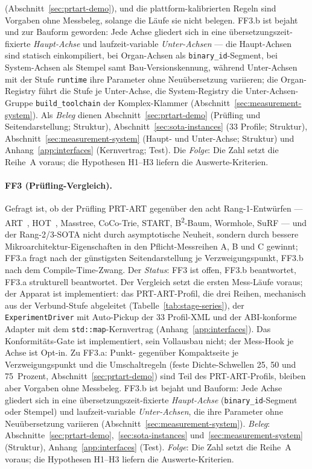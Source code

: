 \begin{nurlang}
(Abschnitt~\ref{sec:prtart-demo}), und die plattform-kalibrierten Regeln sind Vorgaben ohne Messbeleg, solange die
Läufe sie nicht belegen. FF3.b ist bejaht und zur Bauform geworden: Jede Achse gliedert sich in eine
übersetzungszeit-fixierte \emph{Haupt-Achse} und laufzeit-variable \emph{Unter-Achsen}
--- die Haupt-Achsen sind statisch einkompiliert, bei Organ-Achsen als \texttt{binary\_id}-Segment, bei
System-Achsen als Stempel samt Bau-Versionskennung, während Unter-Achsen mit der Stufe
\texttt{runtime} ihre Parameter ohne Neuübersetzung variieren; die Organ-Registry führt die Stufe je
Unter-Achse, die System-Registry die Unter-Achsen-Gruppe \texttt{build\_toolchain} der Komplex-Klammer
(Abschnitt~\ref{sec:measurement-system}). Als \emph{Beleg} dienen Abschnitt~\ref{sec:prtart-demo} (Prüfling
und Seitendarstellung; Struktur), Abschnitt~\ref{sec:sota-instances} (33 Profile; Struktur),
Abschnitt~\ref{sec:measurement-system} (Haupt- und Unter-Achse; Struktur) und
Anhang~\ref{app:interfaces} (Kernvertrag; Test). Die \emph{Folge}: Die Zahl setzt die Reihe~A voraus; die
Hypothesen H1--H3 liefern die Auswerte-Kriterien.
\end{nurlang}
\begin{nurkurz}
\paragraph{FF3 (Prüfling-Vergleich).} Gefragt ist, ob der Prüfling PRT-ART gegenüber den acht
Rang-1-Entwürfen --- ART~\cite{leis2013art}, HOT~\cite{binna2018hot}, Masstree, CoCo-Trie, START,
B\textsuperscript{2}-Baum, Wormhole, SuRF --- und der Rang-2/3-SOTA nicht durch asymptotische Neuheit,
sondern
durch bessere Mikroarchitektur-Eigenschaften in den Pflicht-Messreihen A, B und C gewinnt; FF3.a fragt nach
der günstigsten Seitendarstellung je Verzweigungspunkt, FF3.b nach dem Compile-Time-Zwang. Der
\emph{Status}:
FF3 ist offen, FF3.b beantwortet, FF3.a strukturell beantwortet. Der Vergleich setzt die ersten Mess-Läufe
voraus; der Apparat ist implementiert: das PRT-ART-Profil, die drei Reihen, mechanisch aus der Verbund-Stufe
abgeleitet (Tabelle~\ref{tab:stage-series}), der \texttt{ExperimentDriver} mit Auto-Pickup der 33 Profil-XML
und der ABI-konforme Adapter mit dem \texttt{std::map}-Kernvertrag (Anhang~\ref{app:interfaces}). Das
Konformitäts-Gate ist
implementiert, sein Vollausbau nicht; der Mess-Hook je Achse ist Opt-in. Zu FF3.a: Punkt- gegenüber
Kompaktseite je Verzweigungspunkt und die Umschaltregeln (feste Dichte-Schwellen 25, 50 und 75~Prozent,
Abschnitt~\ref{sec:prtart-demo}) sind Teil des PRT-ART-Profils, bleiben aber Vorgaben ohne Messbeleg. FF3.b
ist bejaht und Bauform: Jede Achse gliedert sich in eine
übersetzungszeit-fixierte \emph{Haupt-Achse} (\texttt{binary\_id}-Segment oder Stempel) und
laufzeit-variable \emph{Unter-Achsen}, die ihre Parameter ohne Neuübersetzung variieren
(Abschnitt~\ref{sec:measurement-system}).
\emph{Beleg}: Abschnitte~\ref{sec:prtart-demo},~\ref{sec:sota-instances} und~\ref{sec:measurement-system}
(Struktur), Anhang~\ref{app:interfaces} (Test).
\emph{Folge}: Die Zahl setzt die Reihe~A voraus; die Hypothesen H1--H3 liefern die Auswerte-Kriterien.
\end{nurkurz}

